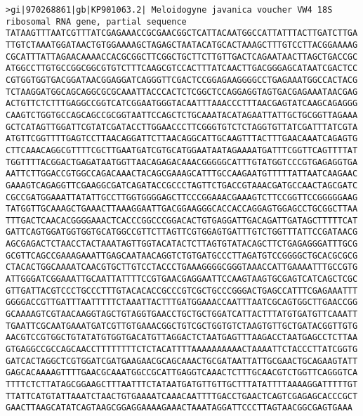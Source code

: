 \documentclass[11pt]{article}
\begin{document}
\begin{Verbatim}[commandchars=\\\{\}]
>gi|970268861|gb|KP901063.2| Meloidogyne javanica voucher VW4 18S ribosomal RNA gene, partial sequence
TATAAGTTTAATCGTTTATCGAGAAACCGCGAACGGCTCATTACAATGGCCATTATTTACTTGATCTTGA
TTGTCTAAATGGATAACTGTGGAAAAGCTAGAGCTAATACATGCACTAAAGCTTTGTCCTTACGGAAAAG
CGCATTTATTAGAACAAAACCACGCGGCTTCGGCTGCTTCTTGTTGACTCAGAATAACTTAGCTGACCGC
ATGGCCTTGTGCCGGCGGCGTGTCTTTCAAGCGTCCACTTTATCAACTTGACGGGAGCATAATCGACTCC
CGTGGTGGTGACGGATAACGGAGGATCAGGGTTCGACTCCGGAGAAGGGGCCTGAGAAATGGCCACTACG
TCTAAGGATGGCAGCAGGCGCGCAAATTACCCACTCTCGGCTCCAGGAGGTAGTGACGAGAAATAACGAG
ACTGTTCTCTTTGAGGCCGGTCATCGGAATGGGTACAATTTAAACCCTTTAACGAGTATCAAGCAGAGGG
CAAGTCTGGTGCCAGCAGCCGCGGTAATTCCAGCTCTGCAAATACATAGAATTATTGCTGCGGTTAGAAA
GCTCATAGTTGGATTCGTATCGATACCTTGGAACCCTTCGGGTGTCTCTAGGTGTTATCGATTTATCGTA
ATGTTCGGTTTTGAGTCCTTAACAGGATTCTTAACAGGCATTGCAAGTTTACTTTGAACAAATCAGAGTG
CTTCAAACAGGCGTTTTCGCTTGAATGATCGTGCATGGAATAATAGAAAATGATTTCGGTTCAGTTTTAT
TGGTTTTACGGACTGAGATAATGGTTAACAGAGACAAACGGGGGCATTTGTATGGTCCCGTGAGAGGTGA
AATTCTTGGACCGTGGCCAGACAAACTACAGCGAAAGCATTTGCCAAGAATGTTTTTATTAATCAAGAAC
GAAAGTCAGAGGTTCGAAGGCGATCAGATACCGCCCTAGTTCTGACCGTAAACGATGCCAACTAGCGATC
CGCCGATGGAAATTATATTGCCTTGGTGGGGAGCTTCCCGGAAACGAAAGTCTTCCGGTTCCGGGGGAAG
TATGGTTGCAAAGCTGAAACTTAAAGGAATTGACGGAAGGGCACCACCAGGAGTGGAGCCTGCGGCTTAA
TTTGACTCAACACGGGGAAACTCACCCGGCCCGGACACTGTGAGGATTGACAGATTGATAGCTTTTTCAT
GATTCAGTGGATGGTGGTGCATGGCCGTTCTTAGTTCGTGGAGTGATTTGTCTGGTTTATTCCGATAACG
AGCGAGACTCTAACCTACTAAATAGTTGGTACATACTCTTAGTGTATACAGCTTCTGAGAGGGATTTGCG
GCGTTCAGCCGAAAGAAATTGAGCAATAACAGGTCTGTGATGCCCTTAGATGTCCGGGGCTGCACGCGCG
CTACACTGGCAAAATCAACGTGCTTGTCCTACCCTGAAAGGGGCGGGTAAACCATTGAAAATTTGCCGTG
ATTGGGATCGGAAATTGCAATTATTTTCCGTGAACGAGGAATTCCAAGTAAGTGCGAGTCATCAGCTCGC
GTTGATTACGTCCCTGCCCTTTGTACACACCGCCCGTCGCTGCCCGGGACTGAGCCATTTCGAGAAATTT
GGGGACCGTTGATTTAATTTTTCTAAATTACTTTGATGGAAACCAATTTAATCGCAGTGGCTTGAACCGG
GCAAAAGTCGTAACAAGGTAGCTGTAGGTGAACCTGCTGCTGGATCATTACTTTATGTGATGTTCAAATT
TGAATTCGCAATGAAATGATCGTTGTGAAACGGCTGTCGCTGGTGTCTAAGTGTTGCTGATACGGTTGTG
AACGTCCGTGGCTGTATATGTGGTGACATGTTAGGACTCTAATGAGTTTAAGACCTAATGAGCCTCTTAA
GTGAGGCCGCCAGCAACCTTTTTTTTCTCTACATTTTAAAAAAAAAACTAAAATTCTACCCTTATCGGTG
GATCACTAGGCTCGTGGATCGATGAAGAACGCAGCAAACTGCGATAATTATTGCGAACTGCAGAAGTATT
GAGCACAAAAGTTTTGAACGCAAATGGCCGCATTGAGGTCAAACTCTTTGCAACGTCTGGTTCAGGGTCA
TTTTCTCTTATAGCGGAAGCTTTAATTTCTATAATGATGTTGTTGCTTTATATTTTAAAAGGATTTTTGT
TTATTCATGTATTAAATCTAACTGTGAAAATCAAACAATTTTGACCTGAACTCAGTCGAGAGCACCCGCT
GAACTTAAGCATATCAGTAAGCGGAGGAAAAGAAACTAAATAGGATTCCCTTAGTAACGGCGAGTGAAA


\end{Verbatim}
\end{document}
